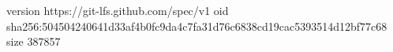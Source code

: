 version https://git-lfs.github.com/spec/v1
oid sha256:504504240641d33af4b0fc9da4c7fa31d76c6838cd19cac5393514d12bf77c68
size 387857
